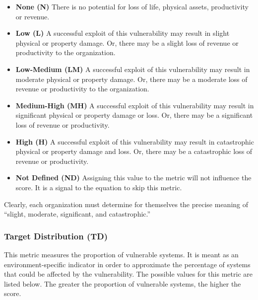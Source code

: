  \begin{itemize}
  \item
    \textbf{None (N)} There is no potential for loss of life, physical
    assets, productivity or revenue.
  \item
    \textbf{Low (L)} A successful exploit of this vulnerability may result
    in slight physical or property damage. Or, there may be a slight loss
    of revenue or productivity to the organization.
  \item
    \textbf{Low-Medium (LM)} A successful exploit of this vulnerability
    may result in moderate physical or property damage. Or, there may be a
    moderate loss of revenue or productivity to the organization.
  \item
    \textbf{Medium-High (MH)} A successful exploit of this vulnerability
    may result in significant physical or property damage or loss. Or,
    there may be a significant loss of revenue or productivity.
  \item
    \textbf{High (H)} A successful exploit of this vulnerability may
    result in catastrophic physical or property damage and loss. Or, there
    may be a catastrophic loss of revenue or productivity.
  \item
    \textbf{Not Defined (ND)} Assigning this value to the metric will not
    influence the score. It is a signal to the equation to skip this
    metric.
  \end{itemize}

  Clearly, each organization must determine for themselves the precise
  meaning of ``slight, moderate, significant, and catastrophic.''

  \subsubsection{Target Distribution (TD)}\label{target-distribution-td}

  This metric measures the proportion of vulnerable systems. It is meant
  as an environment-specific indicator in order to approximate the
  percentage of systems that could be affected by the vulnerability. The
  possible values for this metric are listed below. The greater the
  proportion of vulnerable systems, the higher the score.


